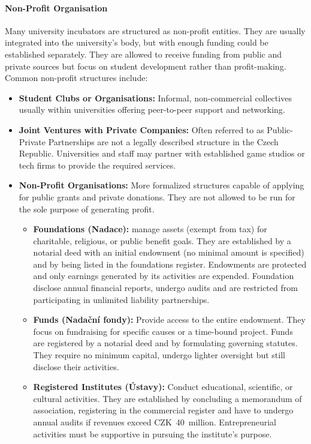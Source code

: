 \paragraph{Non-Profit Organisation}
Many university incubators are structured as non-profit entities. They are usually integrated into the university's body, but with enough funding could be established separately. They are allowed to receive funding from public and private sources but focus on student development rather than profit-making. Common non-profit structures include:
\begin{itemize}
    \item \textbf{Student Clubs or Organisations:} Informal, non-commercial collectives usually within universities offering peer-to-peer support and networking.
    \item \textbf{Joint Ventures with Private Companies:} Often referred to as Public-Private Partnerships are not a legally described structure in the Czech Republic. Universities and staff may partner with established game studios or tech firms to provide the required services.
    \item \textbf{Non-Profit Organisations:} More formalized structures capable of applying for public grants and private donations. They are not allowed to be run for the sole purpose of generating profit.
    \begin{itemize}
        \item \textbf{Foundations (Nadace):} manage assets (exempt from tax) for charitable, religious, or public benefit goals. They are established by a notarial deed with an initial endowment (no minimal amount is specified) and by being listed in the foundations register. Endowments are protected and only earnings generated by its activities are expended. Foundation disclose annual financial reports, undergo audits and are restricted from participating in unlimited liability partnerships.
        \item \textbf{Funds (Nadační fondy):} Provide access to the entire endowment. They focus on fundraising for specific causes or a time-bound project. Funds are registered by a notarial deed and by formulating governing statutes. They require no minimum capital, undergo lighter oversight but still disclose their activities.
        \item \textbf{Registered Institutes (Ústavy):} Conduct educational, scientific, or cultural activities. They are established by concluding a memorandum of association, registering in the commercial register and have to undergo annual audits if revenues exceed CZK~40~million. Entrepreneurial activities must be supportive in pursuing the institute’s purpose.
    \end{itemize}
\end{itemize}

